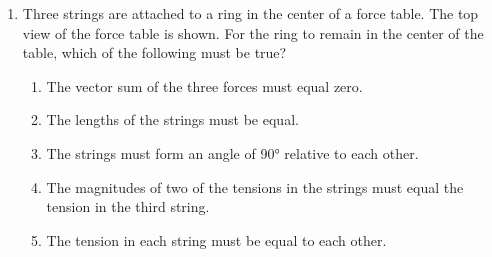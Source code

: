 \documentclass{../../oss-apphys}
\begin{document}
\begin{multicols}{2}
\begin{enumerate}[resume,leftmargin=18pt]
  \item Three strings are attached to a ring in the center of a force table. The
    top view of the force table is shown. For the ring to remain in the
    center of the table, which of the following must be true?
    \begin{enumerate}[noitemsep,topsep=0pt,leftmargin=18pt,label=(\Alph*)]
    \item The vector sum of the three forces must equal zero.
    \item The lengths of the strings must be equal.
    \item The strings must form an angle of \ang{90} relative to each other.
    \item The magnitudes of two of the tensions in the strings must equal the
      tension in the third string.
    \item The tension in each string must be equal to each other.
    \end{enumerate}
%  
%
%

\end{enumerate}
\end{multicols}
\end{document}

